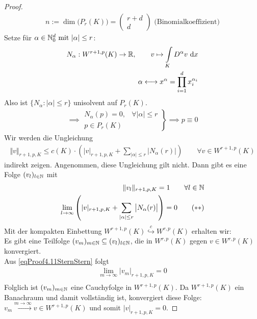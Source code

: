 \begin{proof}
	\begin{align*}
		n:=\dim \big(P_r(K)\big)=\begin{pmatrix}
			r+d\\ d
		\end{pmatrix}\text{ (Binomialkoeffizient)}
	\end{align*}
	Setze  für $\alpha\in\mathbb{N}_0^d\text{ mit }|\alpha|\leq r $:
	\begin{align*}
		N_\alpha:W^{r+1,p}(K)\to\mathbb{R},\qquad v\mapsto\int\limits_K D^\alpha v\text{ d} x\\
		\alpha\longleftrightarrow x^\alpha =\prod\limits_{i=1}^d x_i^{\alpha_i}
	\end{align*}
	Also ist $\big\lbrace N_\alpha:|\alpha|\leq r\big\rbrace$ unisolvent auf $P_r(K)$.
	\begin{align*}
		\implies\left.
		\begin{array}{cl}
			N_\alpha(p)=0, &\forall |\alpha|\leq r \\
			p\in P_r(K)&
		\end{array}
		\right\rbrace
		\implies p\equiv 0
	\end{align*}
	Wir werden die Ungleichung
	\begin{align}\label{eqProof4.11Stern}\tag{$\ast$}
		\Vert v\Vert_{r+1,p,K}\leq c(K)\cdot\left(|v|_{r+1,p,K}+\sum\limits_{|\alpha|\leq r}\big|N_\alpha (r)\big|\right)\qquad\forall v\in W^{r+1,p}(K)
	\end{align}
	indirekt zeigen. Angenommen, diese Ungleichung gilt nicht. Dann gibt es eine Folge $(v_l)_{l\in\mathbb{N}}$ mit
	\begin{align}
		\Vert v_l\Vert_{r+1,p,K}=1\qquad\forall l\in\mathbb{N}\nonumber\\
		\lim\limits_{l\to\infty} \left(|v|_{r+1,p,K}+\sum\limits_{|\alpha|\leq r}\big|N_\alpha (r)\big|\right)=0\label{eqProof4.11SternStern}\tag{$\ast\ast$}
	\end{align}
	Mit der kompakten Einbettung $W^{r+1,p}(K)\stackrel{c}{\hookrightarrow} W^{r,p}(K)$ erhalten wir:\\
	Es gibt eine Teilfolge $(v_m)_{m\in\mathbb{N}}\subseteq(v_l)_{l\in\mathbb{N}}$, die in $W^{r,p}(K)$ gegen $v\in W^{r,p}(K)$ konvergiert.\\
	Aus \eqref{eqProof4.11SternStern} folgt
	\begin{align*}
		\lim\limits_{m\to\infty}|v_m|_{r+1,p,K}=0\\
	\end{align*}
	Folglich ist $(v_m)_{m\in\mathbb{N}}$ eine Cauchyfolge in $W^{r+1,p}(K)$.
	Da $W^{r+1,p}(K)$ ein Banachraum und damit vollständig ist, konvergiert diese Folge: $v_m\stackrel{m\to\infty}{\longrightarrow} v\in W^{r+1,p}(K)$ und somit $|v|_{r+1,p,K}=0$.

\end{proof}
